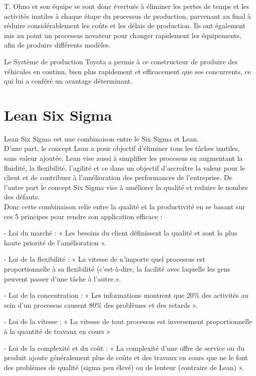 \documentclass[12pt, a4paper]{thesis}
\begin{document}
T. Ohno et son équipe se sont donc évertués à éliminer les pertes de temps et les activités inutiles à chaque étape du processus de production, parvenant au final à réduire considérablement les coûts et les délais de production. Ils ont également mis au point un processus novateur pour changer rapidement les équipements, afin de produire différents modèles.

Le Système de production Toyota a permis à ce constructeur de produire des véhicules en continu, bien plus rapidement et efficacement que ses concurrents, ce qui lui a conféré un avantage déterminant.\\



\section{Lean Six Sigma}
Lean Six Sigma est une combinaison entre le Six Sigma et Lean. \\
D'une part, le concept Lean a pour objectif d’éliminer tous les tâches inutiles, sans valeur ajoutée. Lean vise aussi à simplifier les processus en augmentant la fluidité, la flexibilité, l’agilité et ce dans un objectif d’accroître la valeur pour le client et de contribuer à l’amélioration des performances de l’entreprise. De l'autre part le concept Six Sigma vise à améliorer la qualité et reduire le nombre des défauts.\\
Donc cette combinaison relie entre la qualité et la productivité en se basant sur ces 5 principes pour rendre son application efficace :
\item - Loi du marché : « Les besoins du client définissent la qualité et sont la plus haute priorité de l’amélioration ».
\item - Loi de la flexibilité : « La vitesse de n’importe quel processus est proportionnelle à sa flexibilité (c’est-à-dire, la facilité avec laquelle les gens peuvent passer d’une tâche à l’autre.».
\item - Loi de la concentration : « Les informations montrent que 20\% des activités au sein d’un processus causent 80\% des problèmes et des retards ».
\item - Loi de la vitesse : « La vitesse de tout processus est inversement proportionnelle à la quantité de travaux en cours »
\item - Loi de la complexité et du coût : « La complexité d’une offre de service ou du produit ajoute généralement plus de coûts et des travaux en cours que ne le font des problèmes de qualité (sigma peu élevé) ou de lenteur (contraire de Lean) ».\\
\end{document}
